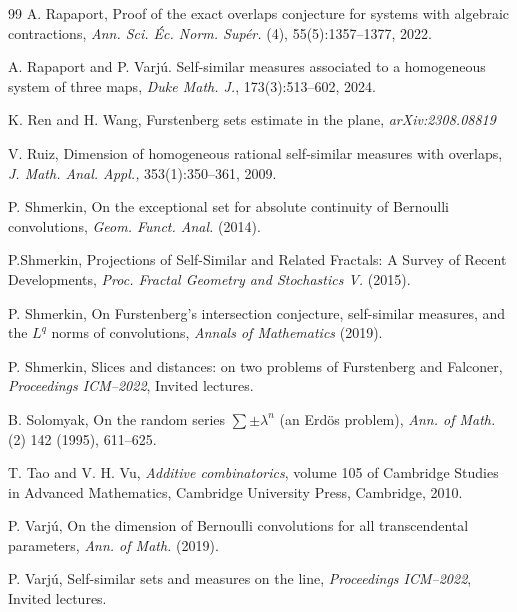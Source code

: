 \documentclass[a4paper,11pt]{amsart}
\theoremstyle{definition}
\numberwithin{equation}{section}
\begin{document}
\begin{thebibliography}{99}
  A. Rapaport, Proof of the exact overlaps conjecture for systems with algebraic contractions,   {\em Ann. Sci. \'Ec. Norm. Sup\'er.} (4), 55(5):1357--1377, 2022.

 A. Rapaport and P. Varj\'u. Self-similar measures associated to a homogeneous system of three maps,  {\em Duke Math. J.}, 173(3):513--602, 2024.

K. Ren and H. Wang,  Furstenberg sets estimate in the plane,  {\em arXiv:2308.08819}

 V.  Ruiz,  Dimension of homogeneous rational self-similar measures with overlaps, {\em J. Math.
Anal. Appl.,} 353(1):350--361, 2009.

 P. Shmerkin, On the exceptional set for absolute continuity of Bernoulli convolutions,    \emph{Geom. Funct. Anal.} (2014).

 P.Shmerkin,  Projections of Self-Similar and Related Fractals: A Survey of Recent Developments, 
{\em Proc.  Fractal Geometry and Stochastics V.} (2015).

 P. Shmerkin, On Furstenberg's intersection conjecture, self-similar measures, and the $L^q$ norms of convolutions,   {\em Annals of Mathematics} (2019).

 P.  Shmerkin,  Slices and distances: on two problems of Furstenberg and Falconer,  {\em Proceedings ICM--2022},  Invited lectures.

 B.  Solomyak, On the random series $\sum \pm \lambda^n$ (an Erd\"os problem),  {\em Ann. of Math. } (2) 142 (1995), 611--625.

T. Tao and V. H. Vu,  {\em Additive combinatorics},  volume 105 of Cambridge Studies in Advanced
Mathematics,  Cambridge University Press,  Cambridge,  2010.

P. Varj\'u, On the dimension of Bernoulli convolutions for all transcendental parameters,  {\em Ann. of Math.} (2019).

 P. Varj\'u,  Self-similar sets and measures on the line,  {\em Proceedings ICM--2022},  Invited lectures.


\end{thebibliography}
\end{document}
